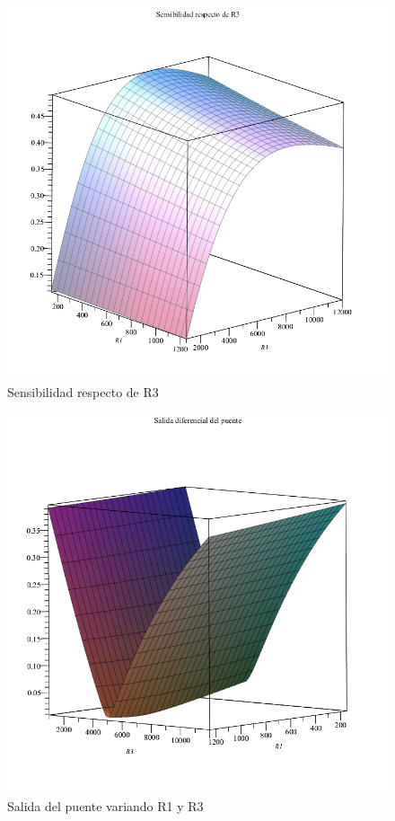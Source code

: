 \begin{figure}[H]
    \centering
    \includegraphics[scale=0.4]{Recursos/cserie_sensibilidad_r3.png}
    \caption{Sensibilidad respecto de R3}
    \label{fig:sensibilidad_r3}
\end{figure}

\begin{figure}[H]
    \centering
    \includegraphics[scale=0.4]{Recursos/cserie_salida.png}
    \caption{Salida del puente variando R1 y R3}
    \label{fig:salida_puente_cserie}
\end{figure}



